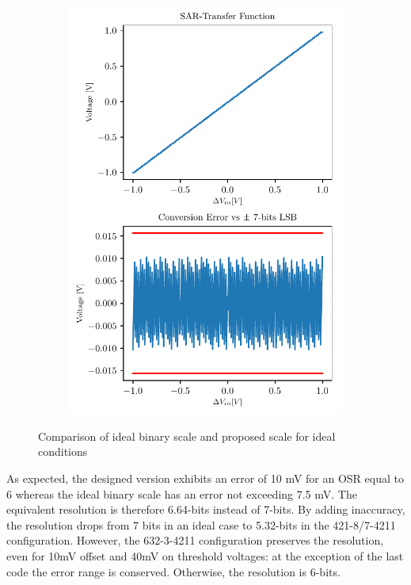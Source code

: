 \begin{figure}[htp]
\begin{subfigure}[b]{0.4\textwidth}
		\includegraphics[width=\textwidth]{Chapter4/Figs/results/sar_resilience/sar-osr6-done.pdf}
	\end{subfigure}
	\caption{Comparison of ideal binary scale and proposed scale for ideal conditions}
	\label{fig:sar-ideal-proposed-scale}
\end{figure}

As expected, the designed version exhibits an error of 10 mV for an OSR equal to 6 whereas the ideal binary scale has an error not exceeding 7.5 mV. The equivalent resolution is therefore 6.64-bits instead of 7-bits. By adding inaccuracy, the resolution drops from 7 bits in an ideal case to 5.32-bits in the 421-8/7-4211 configuration. However, the 632-3-4211 configuration preserves the resolution, even for 10mV offset and 40mV on threshold voltages: at the exception of the last code the error range is conserved. Otherwise, the resolution is 6-bits.

